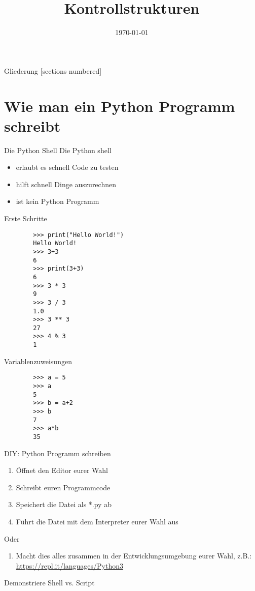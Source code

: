 



\title{Kontrollstrukturen}
\date{\today}




\maketitle

\begin{frame}{Gliederung}
    [sections numbered]
    \tableofcontents
\end{frame}

\section{Wie man ein Python Programm schreibt}
\begin{frame}{Die Python Shell}
	Die Python shell
	\begin{itemize}
		\item erlaubt es schnell Code zu testen
		\item hilft schnell Dinge auszurechnen
		\item ist kein Python Programm
	\end{itemize}
\end{frame}

\begin{frame}[fragile]{Erste Schritte}
	\begin{lstlisting}
		>>> print("Hello World!")
		Hello World!
		>>> 3+3
		6
		>>> print(3+3)
		6
		>>> 3 * 3
		9
		>>> 3 / 3 
		1.0
		>>> 3 ** 3
		27
		>>> 4 % 3
		1
	\end{lstlisting}
\end{frame}

\begin{frame}[fragile]{Variablenzuweisungen}
	\begin{lstlisting}
		>>> a = 5
		>>> a
		5
		>>> b = a+2
		>>> b
		7
		>>> a*b
		35	
	\end{lstlisting}
\end{frame}

\begin{frame}{DIY: Python Programm schreiben}
	\begin{enumerate}
		\item Öffnet den Editor eurer Wahl
		\item Schreibt euren Programmcode
		\item Speichert die Datei als *.py ab
		\item Führt die Datei mit dem Interpreter eurer Wahl aus
	\end{enumerate}
	Oder
	\begin{enumerate}
		\item Macht dies alles zusammen in der Entwicklungsumgebung eurer Wahl, z.B.: \url{https://repl.it/languages/Python3}
	\end{enumerate}
	\pause Demonstriere Shell vs. Script
\end{frame}

